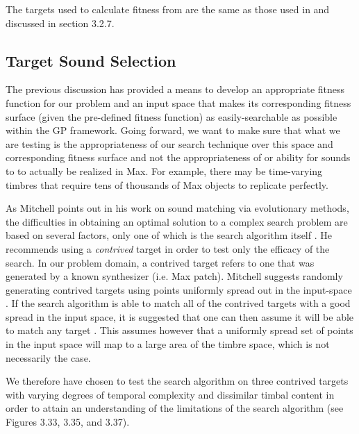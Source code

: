 \documentclass[a4paper,12pt]{report} 	%
\numberwithin{figure}{chapter}
\numberwithin{table}{chapter}
\numberwithin{equation}{chapter}
\begin{document}
\begin{flushleft}
The targets used to calculate fitness from are the same as those used in and discussed in section 3.2.7.

\subsection{Target Sound Selection}

The previous discussion has provided a means to develop an appropriate fitness function for our problem and an input space that makes its corresponding fitness surface (given the pre-defined fitness function) as easily-searchable as possible within the GP framework. Going forward, we want to make sure that what we are testing is the appropriateness of our search technique over this space and corresponding fitness surface and not the appropriateness of or ability for sounds to to actually be realized in Max. For example, there may be time-varying timbres that require tens of thousands of Max objects to replicate perfectly.

As Mitchell points out in his work on sound matching via evolutionary methods, the difficulties in obtaining an optimal solution to a complex search problem are based on several factors, only one of which is the search algorithm itself \cite[p. 1]{Mitchell:2007fe}. He recommends using a \emph{contrived} target in order to test only the efficacy of the search. In our problem domain, a contrived target refers to one that was generated by a known synthesizer (i.e. Max patch). Mitchell suggests randomly generating contrived targets using points uniformly spread out in the input-space \cite[p. 2]{Mitchell:2007fe}. If the search algorithm is able to match all of the contrived targets with a good spread in the input space, it is suggested that one can then assume it will be able to match any target \cite[p. 2]{Mitchell:2007fe}. This assumes however that a uniformly spread set of points in the input space will map to a large area of the timbre space, which is not necessarily the case.

We therefore have chosen to test the search algorithm on three contrived targets with varying degrees of temporal complexity and dissimilar timbal content in order to attain an understanding of the limitations of the search algorithm (see Figures 3.33, 3.35, and 3.37). 


\end{flushleft}
\end{document}
